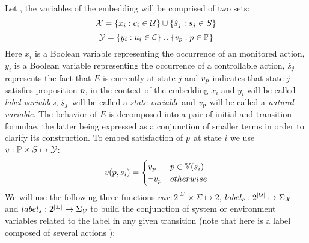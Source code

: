 %
Let \cltsDef, the variables of the embedding will be comprised of two sets:
\[{\mathcal{X}} = \{x_i : c_i \in \mathcal{U} \} \cup \{\hat{s}_{j} : s_j \in S \}\]
\[{\mathcal{Y}} = \{y_i : u_i \in \mathcal{C} \} \cup \{v_{p} : p \in \mathbb{P}\}\]
Here $x_i$ is a Boolean variable representing the occurrence of an monitored action, $y_i$ is a Boolean variable representing the occurrence of a controllable action, $\hat{s}_{j}$ represents the fact that $E$ is currently at state $j$ and $v_{p}$ indicates that state $j$ satisfies proposition $p$,  in the context of the embedding $x_i$ and $y_i$ will be called \emph{label variables}, $\hat{s}_{j}$ will be called a \emph{state variable} and $v_{p}$ will be called a \emph{natural variable}.
The behavior of $E$ is decomposed into a pair of initial and transition formulae, the latter being expressed as a conjunction of smaller terms in order to clarify its construction.
To embed satisfaction of $p$ at state $i$ we use $v:\mathbb{P} \times S \mapsto {\mathcal{Y}}$:
\[
v(p,s_i) = \begin{cases}
v_{p} & p \in \mathbb{V}(s_i) \\
\neg v_{p} & otherwise
\end{cases}
\]
We will use the following three functions $var:2^{|\Sigma|}\times \Sigma \mapsto 2$, $label_e:2^{|\mathcal{U}|}\mapsto \Sigma_{{\mathcal{X}}}$ and $label_s:2^{|\Sigma|}\mapsto \Sigma_{{\mathcal{V}}}$ to build the conjunction of system or environment variables related to the label in any given transition (note that here \actionLabel is a label composed of several actions \action):
